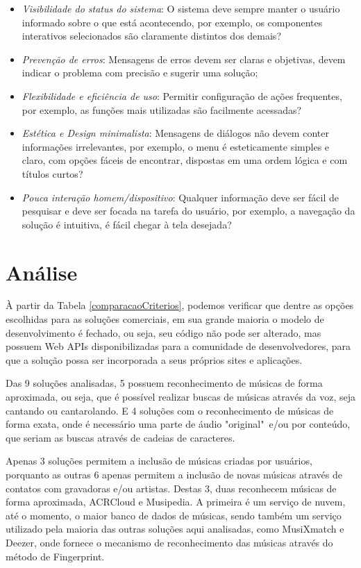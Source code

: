 \begin{itemize}
    \begin{itemize}
        \item \textit{Visibilidade do status do sistema}: O sistema deve sempre manter o usuário informado sobre o que está acontecendo, por exemplo, os componentes interativos selecionados são claramente distintos dos demais?
        \item \textit{Prevenção de erros}: Mensagens de erros devem ser claras e objetivas, devem indicar o problema com precisão e sugerir uma solução;
        \item \textit{Flexibilidade e eficiência de uso}: Permitir configuração de ações frequentes, por exemplo, as funções mais utilizadas são facilmente acessadas?
        \item \textit{Estética e Design minimalista}: Mensagens de diálogos não devem conter informações irrelevantes, por exemplo, o menu é esteticamente simples e claro, com opções fáceis de encontrar, dispostas em uma ordem lógica e com títulos curtos?
        \item \textit{Pouca interação homem/dispositivo}: Qualquer informação deve ser fácil de pesquisar e deve ser focada na tarefa do usuário, por exemplo, a navegação da solução é intuitiva, é fácil chegar à tela desejada?
    \end{itemize}
\end{itemize}

\section{Análise}

À partir da Tabela \ref{comparacaoCriterios}, podemos verificar que dentre as opções escolhidas para as soluções comerciais, em sua grande maioria o modelo de desenvolvimento é fechado, ou seja, seu código não pode ser alterado, mas possuem Web APIs disponibilizadas para a comunidade de desenvolvedores, para que a solução possa ser incorporada a seus próprios sites e aplicações.

Das 9 soluções analisadas, 5 possuem reconhecimento de músicas de forma aproximada, ou seja, que é possível realizar buscas de músicas através da voz, seja cantando ou cantarolando. E 4 soluções com o reconhecimento de músicas de forma exata, onde é necessário uma parte de áudio "original"\ e/ou por conteúdo, que seriam as buscas através de cadeias de caracteres.

Apenas 3 soluções permitem a inclusão de músicas criadas por usuários, porquanto as outras 6 apenas permitem a inclusão de novas músicas através de contatos com gravadoras e/ou artistas. Destas 3, duas reconhecem músicas de forma aproximada, ACRCloud e Musipedia. A primeira é um serviço de nuvem, até o momento, o maior banco de dados de músicas, sendo também um serviço utilizado pela maioria das outras soluções aqui analisadas, como MusiXmatch e Deezer, onde fornece o mecanismo de reconhecimento das músicas através do método de Fingerprint.

